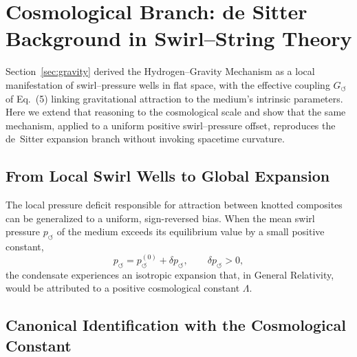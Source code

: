 \documentclass[10pt,reprint,aps,onecolumn,nofootinbib]{revtex4-2}
\begin{document}
    \section{Cosmological Branch: de Sitter Background in Swirl--String Theory}
    \label{sec:desitter}

        \begin{tcolorbox}[colframe=gray, title={Canonical Context}]
        Section~\ref{sec:gravity} derived the Hydrogen--Gravity Mechanism as a local manifestation of swirl--pressure wells in flat space, with the effective coupling $G_{\!\circlearrowleft}$ of Eq.~(5) linking gravitational attraction to the medium's intrinsic parameters.
        Here we extend that reasoning to the cosmological scale and show that the same mechanism, applied to a uniform positive swirl--pressure offset, reproduces the de~Sitter expansion branch without invoking spacetime curvature.
        \end{tcolorbox}

        \subsection{From Local Swirl Wells to Global Expansion}

            The local pressure deficit responsible for attraction between knotted composites can be generalized to a uniform, sign-reversed bias.
            When the mean swirl pressure $p_{\!\circlearrowleft}$ of the medium exceeds its equilibrium value by a small positive constant,
            \begin{equation}
            p_{\!\circlearrowleft} = p_{\!\circlearrowleft}^{(0)} + \delta p_{\!\circlearrowleft},
            \qquad
            \delta p_{\!\circlearrowleft} > 0,
            \end{equation}
            the condensate experiences an isotropic expansion that, in General Relativity, would be attributed to a positive cosmological constant $\Lambda$.

        \subsection{Canonical Identification with the Cosmological Constant}
\end{document}
